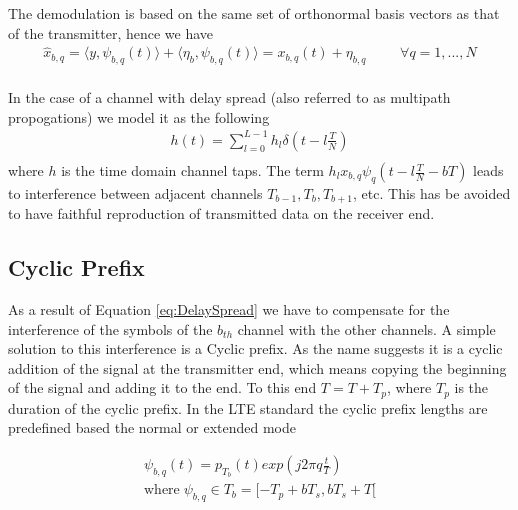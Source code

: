         The demodulation is based on the same set of orthonormal basis vectors as that of the transmitter, hence we have
        \begin{equation}
            \begin{aligned}\label{eq:InnerProductRxIdeal}
                \hat{x}_{b,q} = \langle y,\psi_{b,q}(t)\rangle + \langle\eta_{b},\psi_{b,q}(t)\rangle = x_{b,q}(t) + \eta_{b,q} & & & \forall q = 1,...,N \\
            \end{aligned}
        \end{equation}

        In the case of a channel with delay spread (also referred to as multipath propogations) we model it as the following
        \begin{equation} \label{eq:DelaySpread}
            \begin{split}
                h(t) = \sum_{l=0}^{L-1}h_l\delta{(t-l\frac{T}{N})} \\ 
            \end{split}
        \end{equation}
        where $h$ is the time domain channel taps. The term $h_lx_{b,q}\psi_q(t-l\frac{T}{N}-bT)$ leads to interference between adjacent channels $T_{b-1},T_{b},T_{b+1}$, etc. This has be avoided to have faithful reproduction of transmitted data on the receiver end.

\subsection{Cyclic Prefix}\label{ssec:CP}

As a result of Equation \ref{eq:DelaySpread} we have to compensate for the interference of the symbols of the $b_{th}$ channel with the other channels. A simple solution to this interference is a Cyclic prefix. As the name suggests it is a cyclic addition of the signal at the transmitter end, which means copying the beginning of the signal and adding it to the end. To this end $T = T + T_p$, where $T_p$ is the duration of the cyclic prefix. In the LTE standard the cyclic prefix lengths are predefined based the normal or extended mode \cite{3gpp36211}

\begin{equation}
    \begin{split}
        \psi_{b,q}(t) = p_{T_b}(t)exp\left( j2\pi{q}\frac{t}{T} \right) \\
        \text{where} \; \psi_{b,q} \in T_b = [-T_p + bT_s , bT_s + T [
    \end{split}
\end{equation}

